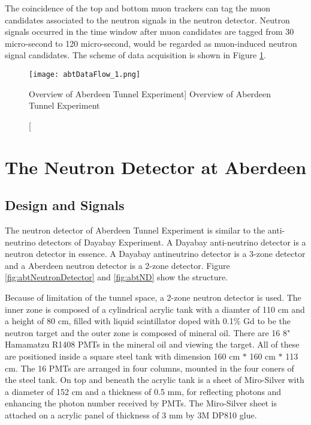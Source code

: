 The coincidence of the top and bottom muon trackers can tag the muon candidates
associated to the neutron signals in the neutron detector. Neutron signals occurred
in the time window after muon candidates are tagged from 30 micro-second to
120 micro-second, would be regarded as muon-induced neutron signal candidates.
The scheme of data acquisition is shown in Figure
\ref{fig:abtDataFlow}.



\begin{figure}
    \centering
    \texttt{[image: abtDataFlow\_1.png]}
    \caption
    [Overview of Aberdeen Tunnel Experiment]
    {Overview of Aberdeen Tunnel Experiment}
    \label{fig:abtDataFlow}
    \end{figure}


\section{The Neutron Detector at Aberdeen}
\label{sec:ND}
\subsection{Design and Signals}

The neutron detector of Aberdeen Tunnel Experiment is similar to the
anti-neutrino detectors of Dayabay Experiment. A Dayabay anti-neutrino
detector is a neutron detector in essence. A Dayabay antineutrino detector is a
3-zone detector and a Aberdeen neutron detector is a 2-zone detector.
Figure \ref{fig:abtNeutronDetector} and \ref{fig:abtND} show the structure.

Because of limitation of the tunnel space, a 2-zone neutron detector is used.
The inner zone is composed of a cylindrical acrylic tank with a diamter of 110 cm and a height of 80 cm,
filled with liquid scintillator doped with 0.1\% Gd to be the neutron target and
the outer zone is composed of mineral oil. There are 16 8" Hamamatzu R1408 PMTs in the mineral oil and viewing the target.
All of these are positioned inside a square steel tank with dimension 160 cm $*$ 160 cm $*$ 113 cm. The 16 PMTs
are arranged in four columns, mounted in the four coners of the steel tank. On top and beneath the acrylic tank is
a sheet of Miro-Silver \cite{MiroSilver} with a diameter of 152 cm and a thickness of 0.5 mm, for reflecting photons and
enhancing the photon number received by PMTs.
The Miro-Silver sheet is attached on a acrylic panel of thickness of 3 mm by 3M DP810 \cite{3M} glue.

